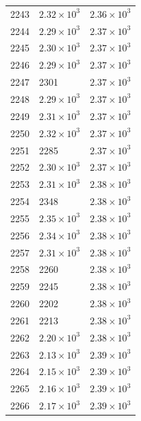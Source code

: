 \begin{table}[H]
\begin{tabular}{lll}
2243 & $\displaystyle 2.32 \times 10^{3}$ & $\displaystyle 2.36 \times 10^{3}$ \\
2244 & $\displaystyle 2.29 \times 10^{3}$ & $\displaystyle 2.37 \times 10^{3}$ \\
2245 & $\displaystyle 2.30 \times 10^{3}$ & $\displaystyle 2.37 \times 10^{3}$ \\
2246 & $\displaystyle 2.29 \times 10^{3}$ & $\displaystyle 2.37 \times 10^{3}$ \\
2247 & 2301 & $\displaystyle 2.37 \times 10^{3}$ \\
2248 & $\displaystyle 2.29 \times 10^{3}$ & $\displaystyle 2.37 \times 10^{3}$ \\
2249 & $\displaystyle 2.31 \times 10^{3}$ & $\displaystyle 2.37 \times 10^{3}$ \\
2250 & $\displaystyle 2.32 \times 10^{3}$ & $\displaystyle 2.37 \times 10^{3}$ \\
2251 & 2285 & $\displaystyle 2.37 \times 10^{3}$ \\
2252 & $\displaystyle 2.30 \times 10^{3}$ & $\displaystyle 2.37 \times 10^{3}$ \\
2253 & $\displaystyle 2.31 \times 10^{3}$ & $\displaystyle 2.38 \times 10^{3}$ \\
2254 & 2348 & $\displaystyle 2.38 \times 10^{3}$ \\
2255 & $\displaystyle 2.35 \times 10^{3}$ & $\displaystyle 2.38 \times 10^{3}$ \\
2256 & $\displaystyle 2.34 \times 10^{3}$ & $\displaystyle 2.38 \times 10^{3}$ \\
2257 & $\displaystyle 2.31 \times 10^{3}$ & $\displaystyle 2.38 \times 10^{3}$ \\
2258 & 2260 & $\displaystyle 2.38 \times 10^{3}$ \\
2259 & 2245 & $\displaystyle 2.38 \times 10^{3}$ \\
2260 & 2202 & $\displaystyle 2.38 \times 10^{3}$ \\
2261 & 2213 & $\displaystyle 2.38 \times 10^{3}$ \\
2262 & $\displaystyle 2.20 \times 10^{3}$ & $\displaystyle 2.38 \times 10^{3}$ \\
2263 & $\displaystyle 2.13 \times 10^{3}$ & $\displaystyle 2.39 \times 10^{3}$ \\
2264 & $\displaystyle 2.15 \times 10^{3}$ & $\displaystyle 2.39 \times 10^{3}$ \\
2265 & $\displaystyle 2.16 \times 10^{3}$ & $\displaystyle 2.39 \times 10^{3}$ \\
2266 & $\displaystyle 2.17 \times 10^{3}$ & $\displaystyle 2.39 \times 10^{3}$ \\

\end{tabular}
\end{table}
